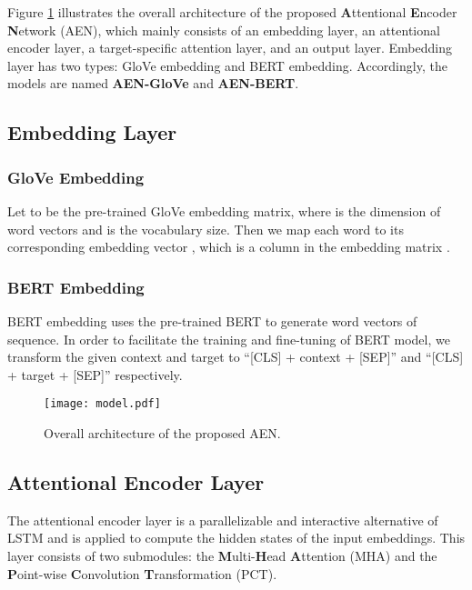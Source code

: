\documentclass[11pt,a4paper]{article}
\begin{document}
Figure \ref{fig:model} illustrates the overall architecture of the proposed \textbf{A}ttentional \textbf{E}ncoder \textbf{N}etwork (AEN), which mainly consists of an embedding layer, an attentional encoder layer, a target-specific attention layer, and an output layer.
Embedding layer has two types: GloVe embedding and BERT embedding.
Accordingly, the models are named \textbf{AEN-GloVe} and \textbf{AEN-BERT}.

\subsection{Embedding Layer}

\subsubsection{GloVe Embedding}

Let  to be the pre-trained GloVe \cite{pennington2014glove} embedding matrix,
where  is the dimension of word vectors and  is the vocabulary size.
Then we map each word  to its corresponding embedding vector ,
which is a column in the embedding matrix .

\subsubsection{BERT Embedding}

BERT embedding uses the pre-trained BERT to generate word vectors of sequence.
In order to facilitate the training and fine-tuning of BERT model,
we transform the given context and target to
``[CLS] + context + [SEP]'' and ``[CLS] + target + [SEP]'' respectively.

\begin{figure}
\centering
\texttt{[image: model.pdf]}
\caption{Overall architecture of the proposed AEN.}
\label{fig:model}
\end{figure}

\subsection{Attentional Encoder Layer} \label{Attentional Encoder}

The attentional encoder layer is a parallelizable and interactive alternative of LSTM
and is applied to compute the hidden states of the input embeddings.
This layer consists of two submodules:
the \textbf{M}ulti-\textbf{H}ead \textbf{A}ttention (MHA) and the \textbf{P}oint-wise \textbf{C}onvolution \textbf{T}ransformation (PCT).
\end{document}
